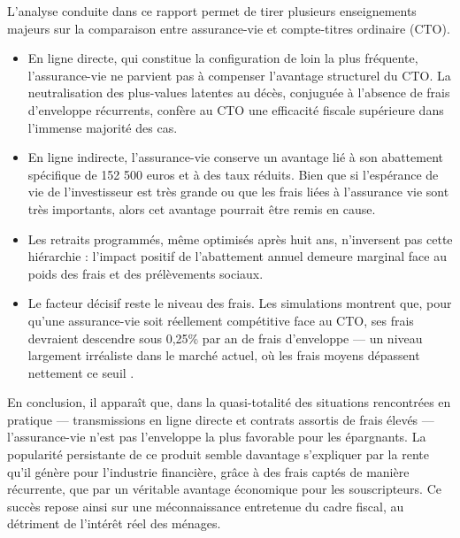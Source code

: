 \label{sec:conclusion}

L'analyse conduite dans ce rapport permet de tirer plusieurs enseignements majeurs sur la comparaison entre assurance-vie et compte-titres ordinaire (CTO).
\begin{itemize}
    \item En ligne directe, qui constitue la configuration de loin la plus fréquente, l'assurance-vie ne parvient pas à compenser l'avantage structurel du CTO. La neutralisation des plus-values latentes au décès, conjuguée à l'absence de frais d'enveloppe récurrents, confère au CTO une efficacité fiscale supérieure dans l'immense majorité des cas.
    \item En ligne indirecte, l'assurance-vie conserve un avantage lié à son abattement spécifique de 152 500 euros et à des taux réduits. Bien que si l'espérance de vie de l'investisseur est très grande ou que les frais liées à l'assurance vie sont très importants, alors cet avantage pourrait être remis en cause.
    \item Les retraits programmés, même optimisés après huit ans, n'inversent pas cette hiérarchie : l'impact positif de l'abattement annuel demeure marginal face au poids des frais et des prélèvements sociaux.
    \item Le facteur décisif reste le niveau des frais. Les simulations montrent que, pour qu'une assurance-vie soit réellement compétitive face au CTO, ses frais devraient descendre sous 0,25\% par an de frais d'enveloppe — un niveau largement irréaliste dans le marché actuel, où les frais moyens dépassent nettement ce seuil \cite{rapport_observatoire_epargne_2025}.
\end{itemize}

En conclusion, il apparaît que, dans la quasi-totalité des situations rencontrées en pratique — transmissions en ligne directe et contrats assortis de frais élevés — l'assurance-vie n'est pas l'enveloppe la plus favorable pour les épargnants. La popularité persistante de ce produit semble davantage s'expliquer par la rente qu'il génère pour l'industrie financière, grâce à des frais captés de manière récurrente, que par un véritable avantage économique pour les souscripteurs. Ce succès repose ainsi sur une méconnaissance entretenue du cadre fiscal, au détriment de l'intérêt réel des ménages.

